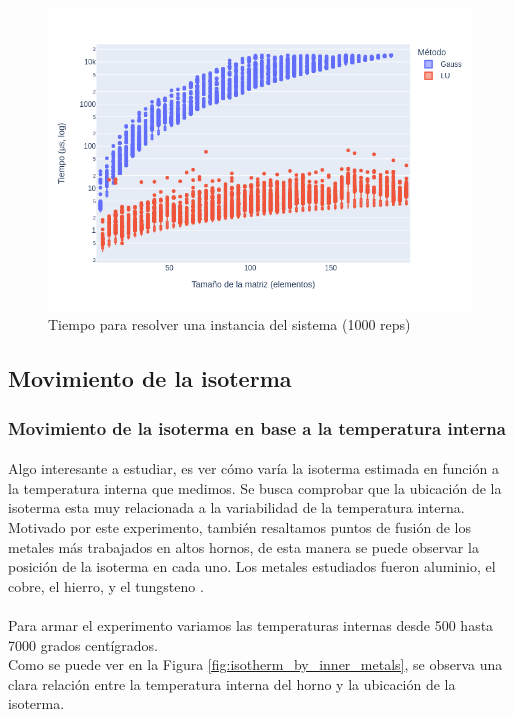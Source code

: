\documentclass[12pt]{article}
\begin{document}
\begin{figure}[H]
\centering
\includegraphics[scale=0.5]{times.1.t_solve}
\caption{Tiempo para resolver una instancia del sistema (1000 reps)}
\label{fig:solve.time}
\end{figure}

\subsection{Movimiento de la isoterma}

\subsubsection{Movimiento de la isoterma en base a la temperatura interna}

\paragraph{} Algo interesante a estudiar, es ver cómo varía la isoterma estimada en función a la temperatura interna que medimos. Se busca comprobar que la ubicación de la isoterma esta muy relacionada a la variabilidad de la temperatura interna. Motivado por este experimento, también resaltamos puntos de fusión de los metales más trabajados en altos hornos, de esta manera se puede observar la posición de la isoterma en cada uno. Los metales estudiados fueron aluminio, el cobre, el hierro, y el tungsteno \cite{big:metales}. 
\paragraph{} Para armar el experimento variamos las temperaturas internas desde 500 hasta 7000 grados centígrados. \\
Como se puede ver en la Figura \ref{fig:isotherm_by_inner_metals}, se observa una clara relación entre la temperatura interna del horno y la ubicación de la isoterma. 
\end{document}

